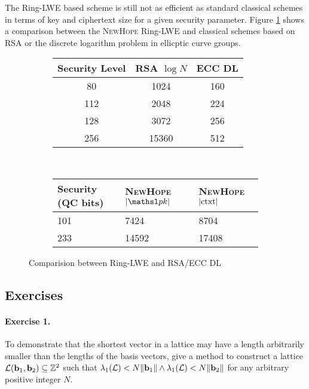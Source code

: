 \noindent The Ring-LWE based scheme is still not as efficient as standard classical schemes in terms of key and ciphertext size for a given security parameter. Figure \ref{fig:ringlwe comparison} shows a comparison between the \textsc{NewHope} Ring-LWE and classical schemes based on RSA or the discrete logarithm problem in ellicptic curve groups. 
\begin{figure}[h!]
    \centering
    \begin{subfigure}[h]{0.5\textwidth}
            \centering
            \begin{tabular}{|c|c|c|}
            \hline
            Security Level & RSA $\log N$ & ECC DL\\
            \hline
            \hline
            80 & 1024 & 160\\
            \hline
            112 & 2048 & 224\\
            \hline
            128 & 3072 & 256\\
            \hline
            256 & 15360 & 512\\
            \hline
            \end{tabular}
    \end{subfigure}
    ~
    \begin{subfigure}[h]{0.4\textwidth}
            \centering
            \begin{tabular}{|p{20mm}|p{20mm}|p{20mm}|}
            \hline
            Security (QC bits) & \textsc{NewHope} $\abs{\pk}$ & \textsc{NewHope} ${\displaystyle \left| {\textnormal{ctxt}} \right| }$ \\
            \hline
            \hline
            101 & 7424 & 8704\\
            \hline
            233 & 14592 & 17408\\
            \hline
            \end{tabular}
    \end{subfigure}
    \caption{Comparision between Ring-LWE and RSA/ECC DL}
    \label{fig:ringlwe comparison}
\end{figure}

\newpage

\subsection{Exercises}

\paragraph{Exercise 1.}
To demonstrate that the shortest vector in a lattice may have a length 
arbitrarily smaller than the lengths of the basis vectors, give a method to 
construct a lattice ${\cal L}({{\bf b}}_1, {{\bf b}}_2) \subseteq \mathbb{Z}^2$ such that 
$\lambda_1({\cal L}) < N\|{{\bf b}}_1\| \wedge \lambda_1({\cal L}) < N\|{{\bf b}}_2\|$ 
for any arbitrary positive integer $N$.

